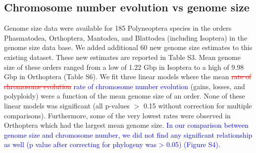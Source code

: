\documentclass[]{rsos}%
\begin{document}
\subsection{Chromosome number evolution vs genome size}
Genome size data were available for 185 Polyneoptera species in the orders Phasmatodea, Orthoptera, Mantodea, and Blattodea (including Isoptera) in the genome size data base. We added additional 60 new genome size estimates to this existing dataset. These new estimates are reported in Table S3.
Mean genome size of these orders ranged from a low of 1.22 Gbp in Isoptera to a high of 9.98 Gbp in Orthoptera (Table S6).
We fit three linear models where the mean \textcolor{red}{\st{rate of chromosome evolution}} \textcolor{blue}{rate of chromosome number evolution} (gains, losses, and polyploidy) were a function of the mean genome size of an order.
None of these linear models was significant (all p-values $>$ 0.15 without correction for multiple comparisons).
Furthermore, some of the very lowest rates were observed in Orthoptera which had the largest mean genome size.
\textcolor{blue}{In our comparison between genome size and chromosome number, we did not find any significant relationship as well (p value after correcting for phylogeny was > 0.05) (Figure S4).}
\end{document}
